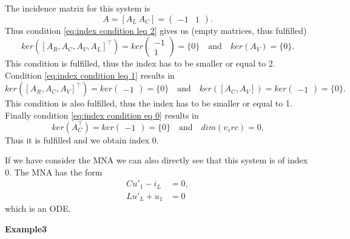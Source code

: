 	The incidence matrix for this system is
	\begin{displaymath}
		A = [A_L~A_C] = 
		\left(
		\begin{matrix}
			-1 & 1
		\end{matrix}
		\right).
	\end{displaymath} 
	Thus condition \eqref{eq:index condition leq 2} gives us (empty matrices, thus fulfilled)
	\begin{displaymath}
		ker([A_R, A_C, A_V, A_L]^\top) = ker
		\left(
		\begin{matrix}
			-1 \\
			1
		\end{matrix}
		\right) = \{0\}
		\quad \text{and} \quad 
		ker(A_V) = \{0\}.
	\end{displaymath}
	This condition is fulfilled, thus the index has to be smaller or equal to 2.
	Condition \eqref{eq:index condition leq 1} results in
	\begin{displaymath}
		ker([A_R, A_C, A_V]^\top) = ker\left(
		\begin{matrix}
			-1
		\end{matrix}
		\right) = \{0\}
		\quad \text{and} \quad
		ker([A_C, A_V]) = ker
		\left(
		\begin{matrix}
			-1
		\end{matrix}
		\right) = \{0\}.
	\end{displaymath}
	This condition is also fulfilled, thus the index has to be smaller or equal to 1.
	Finally condition \eqref{eq:index condition eq 0} results in
	\begin{displaymath}
		ker(A_C^\top) = ker\left(
		\begin{matrix}
			-1
		\end{matrix}
		\right) = \{0\}		
		\quad \text{and} \quad 
		dim(v_src) = 0.
	\end{displaymath}
	Thus it is fulfilled and we obtain index 0.
	
	If we have consider the MNA we can also directly see that this system is of index 0. The MNA has the form
	\begin{displaymath}
		\begin{aligned}
			C u'_1 - i_L &= 0, \\
			L u'_L + u_1 &= 0
		\end{aligned}
	\end{displaymath}
	which is an ODE.
	
	\textbf{Example3} \\

